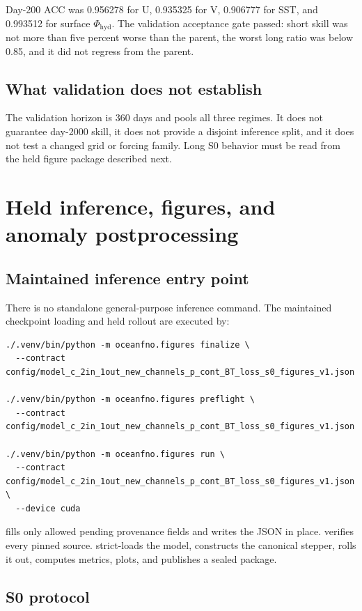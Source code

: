\documentclass[11pt,oneside]{report}
\newcommand{\code}[1]{\texttt{\detokenize{#1}}}
\begin{document}
Day-200 ACC was 0.956278 for U, 0.935325 for V, 0.906777 for SST, and
0.993512 for surface \(\Phi_{\mathrm{hyd}}\). The validation acceptance gate
passed: short skill was not more than five percent worse than the parent, the
worst long ratio was below 0.85, and it did not regress from the parent.

\section{What validation does not establish}

The validation horizon is 360 days and pools all three regimes. It does not
guarantee day-2000 skill, it does not provide a disjoint inference split, and it
does not test a changed grid or forcing family. Long S0 behavior must be read
from the held figure package described next.

\chapter{Held inference, figures, and anomaly postprocessing}
\label{ch:inference}

\section{Maintained inference entry point}

There is no standalone general-purpose inference command. The maintained
checkpoint loading and held rollout are executed by:
\begin{lstlisting}
./.venv/bin/python -m oceanfno.figures finalize \
  --contract config/model_c_2in_1out_new_channels_p_cont_BT_loss_s0_figures_v1.json

./.venv/bin/python -m oceanfno.figures preflight \
  --contract config/model_c_2in_1out_new_channels_p_cont_BT_loss_s0_figures_v1.json

./.venv/bin/python -m oceanfno.figures run \
  --contract config/model_c_2in_1out_new_channels_p_cont_BT_loss_s0_figures_v1.json \
  --device cuda
\end{lstlisting}

\code{finalize} fills only allowed pending provenance fields and writes the JSON
in place. \code{preflight} verifies every pinned source. \code{run}
strict-loads the model, constructs the canonical stepper, rolls it out, computes
metrics, plots, and publishes a sealed package.

\section{S0 protocol}
\end{document}
